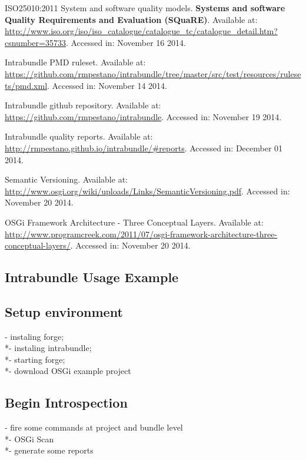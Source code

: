 \documentclass[cic,tc,english]{iiufrgs} %
\begin{document}
\begin{thebibliography}{este-parametro-nao-eh-usado-pelo-estilo-ABNT}
 ISO25010:2011
System and software quality models. \textbf{Systems and software Quality Requirements and Evaluation (SQuaRE)}. Available at: \url{http://www.iso.org/iso/iso_catalogue/catalogue_tc/catalogue_detail.htm?csnumber=35733}. Accessed in: November 16 2014.

Intrabundle PMD ruleset. Available at: \url{https://github.com/rmpestano/intrabundle/tree/master/src/test/resources/rulesets/pmd.xml}. Accessed in: November 14 2014.

Intrabundle github repository. Available at: \url{https://github.com/rmpestano/intrabundle}. Accessed in: November 19 2014.

Intrabundle quality reports. Available at: \url{http://rmpestano.github.io/intrabundle/#reports}. Accessed in: December 01 2014.

Semantic Versioning. Available at: \url{http://www.osgi.org/wiki/uploads/Links/SemanticVersioning.pdf}. Accessed in: November 20 2014.

OSGi Framework Architecture - Three Conceptual Layers. Available at: \url{http://www.programcreek.com/2011/07/osgi-framework-architecture-three-conceptual-layers/}. Accessed in: November 20 2014.


\end{thebibliography}

\begin{appendices}
\chapter{Intrabundle Usage Example}

\section{Setup environment}

- instaling forge;\\*- instaling intrabundle; \\*- starting forge;\\*- download OSGi example project 

\section{Begin Introspection}
- fire some commands at project and bundle level\\*- OSGi Scan \\*- generate some reports

\end{appendices}
\end{document}
